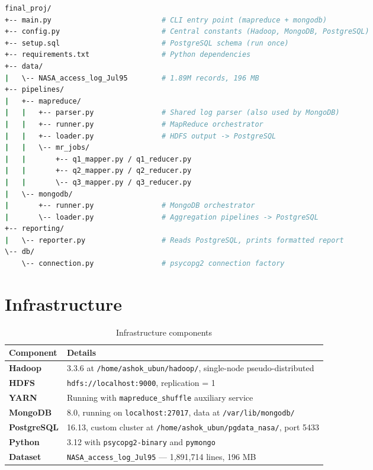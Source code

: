 \documentclass[12pt,a4paper]{article}
\begin{document}
\begin{lstlisting}[language=bash, caption={Repository layout}]
final_proj/
+-- main.py                          # CLI entry point (mapreduce + mongodb)
+-- config.py                        # Central constants (Hadoop, MongoDB, PostgreSQL)
+-- setup.sql                        # PostgreSQL schema (run once)
+-- requirements.txt                 # Python dependencies
+-- data/
|   \-- NASA_access_log_Jul95        # 1.89M records, 196 MB
+-- pipelines/
|   +-- mapreduce/
|   |   +-- parser.py                # Shared log parser (also used by MongoDB)
|   |   +-- runner.py                # MapReduce orchestrator
|   |   +-- loader.py                # HDFS output -> PostgreSQL
|   |   \-- mr_jobs/
|   |       +-- q1_mapper.py / q1_reducer.py
|   |       +-- q2_mapper.py / q2_reducer.py
|   |       \-- q3_mapper.py / q3_reducer.py
|   \-- mongodb/
|       +-- runner.py                # MongoDB orchestrator
|       \-- loader.py                # Aggregation pipelines -> PostgreSQL
+-- reporting/
|   \-- reporter.py                  # Reads PostgreSQL, prints formatted report
\-- db/
    \-- connection.py                # psycopg2 connection factory
\end{lstlisting}

\section{Infrastructure}

\begin{table}[h!]
\centering
\begin{tabularx}{\textwidth}{>{\bfseries}lX}
\toprule
Component & Details \\
\midrule
Hadoop    & 3.3.6 at \texttt{/home/ashok\_ubun/hadoop/}, single-node pseudo-distributed \\
HDFS      & \texttt{hdfs://localhost:9000}, replication = 1 \\
YARN      & Running with \texttt{mapreduce\_shuffle} auxiliary service \\
MongoDB   & 8.0, running on \texttt{localhost:27017}, data at \texttt{/var/lib/mongodb/} \\
PostgreSQL & 16.13, custom cluster at \texttt{/home/ashok\_ubun/pgdata\_nasa/}, port 5433 \\
Python    & 3.12 with \texttt{psycopg2-binary} and \texttt{pymongo} \\
Dataset   & \texttt{NASA\_access\_log\_Jul95} --- 1,891,714 lines, 196 MB \\
\bottomrule
\end{tabularx}
\caption{Infrastructure components}
\end{table}
\end{document}
